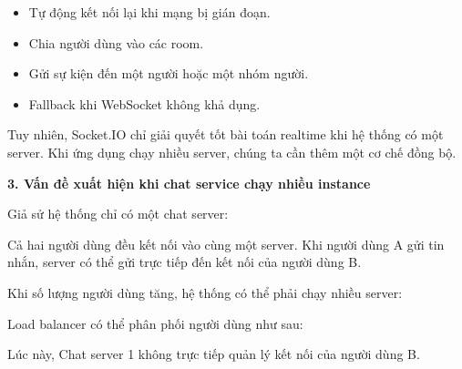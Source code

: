 \begin{itemize}
\tightlist
\item
  Tự động kết nối lại khi mạng bị gián đoạn.
\item
  Chia người dùng vào các room.
\item
  Gửi sự kiện đến một người hoặc một nhóm người.
\item
  Fallback khi WebSocket không khả dụng.
\end{itemize}

Tuy nhiên, Socket.IO chỉ giải quyết tốt bài toán realtime khi hệ thống
có một server. Khi ứng dụng chạy nhiều server, chúng ta cần thêm một cơ
chế đồng bộ.

\vspace{0.5em}\noindent\textbf{3. Vấn đề xuất hiện khi chat service chạy nhiều
instance}\par

Giả sử hệ thống chỉ có một chat server:

\begin{Shaded}
\begin{Highlighting}[]
\end{Highlighting}
\end{Shaded}

Cả hai người dùng đều kết nối vào cùng một server. Khi người dùng A gửi
tin nhắn, server có thể gửi trực tiếp đến kết nối của người dùng B.

Khi số lượng người dùng tăng, hệ thống có thể phải chạy nhiều server:

\begin{Shaded}
\begin{Highlighting}[]
\end{Highlighting}
\end{Shaded}

Load balancer có thể phân phối người dùng như sau:

\begin{Shaded}
\begin{Highlighting}[]
\end{Highlighting}
\end{Shaded}

Lúc này, Chat server 1 không trực tiếp quản lý kết nối của người dùng B.

